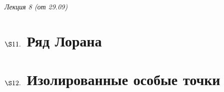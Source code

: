 \begin{flushright}
    \textit{Лекция 8 (от 29.09)}
\end{flushright}
\section{$\S 11.$ Ряд Лорана}
\section{$\S 12.$ Изолированные особые точки}
